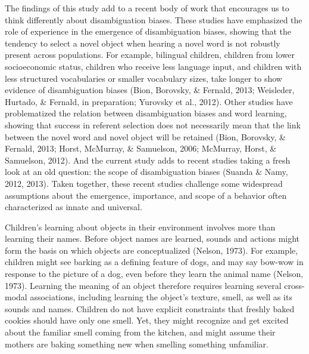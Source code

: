 \documentclass[english,floatsintext,man]{apa6}
\theoremstyle{definition}
\theoremstyle{definition}
\theoremstyle{definition}
\theoremstyle{remark}
\begin{document}
The findings of this study add to a recent body of work that encourages
us to think differently about disambiguation biases. These studies have
emphasized the role of experience in the emergence of disambiguation
biases, showing that the tendency to select a novel object when hearing
a novel word is not robustly present across populations. For example,
bilingual children, children from lower socioeconomic status, children
who receive less language input, and children with less structured
vocabularies or smaller vocabulary sizes, take longer to show evidence
of disambiguation biases (Bion, Borovsky, \& Fernald, 2013; Weisleder,
Hurtado, \& Fernald, in preparation; Yurovsky et al., 2012). Other
studies have problematized the relation between disambiguation biases
and word learning, showing that success in referent selection does not
necessarily mean that the link between the novel word and novel object
will be retained (Bion, Borovsky, \& Fernald, 2013; Horst, McMurray, \&
Samuelson, 2006; McMurray, Horst, \& Samuelson, 2012). And the current
study adds to recent studies taking a fresh look at an old question: the
scope of disambiguation biases (Suanda \& Namy, 2012, 2013). Taken
together, these recent studies challenge some widespread assumptions
about the emergence, importance, and scope of a behavior often
characterized as innate and universal.

Children's learning about objects in their environment involves more
than learning their names. Before object names are learned, sounds and
actions might form the basis on which objects are conceptualized
(Nelson, 1973). For example, children might see barking as a defining
feature of dogs, and may say bow-wow in response to the picture of a
dog, even before they learn the animal name (Nelson, 1973). Learning the
meaning of an object therefore requires learning several cross-modal
associations, including learning the object's texture, smell, as well as
its sounds and names. Children do not have explicit constraints that
freshly baked cookies should have only one smell. Yet, they might
recognize and get excited about the familiar smell coming from the
kitchen, and might assume their mothers are baking something new when
smelling something unfamiliar.
\end{document}
